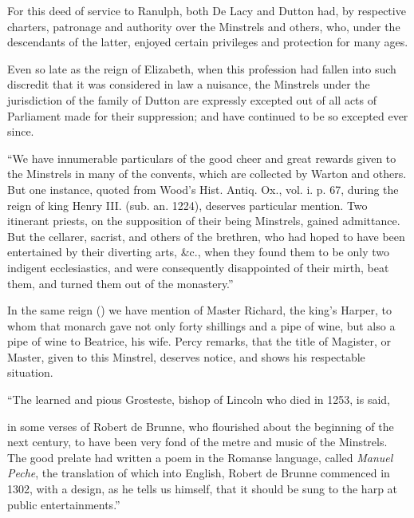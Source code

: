 For this deed of service to Ranulph, both De Lacy and Dutton had, by
respective charters, patronage and authority over the Minstrels and others, who,
under the descendants of the latter, enjoyed certain privileges and protection for
many ages.

Even so late as the reign of Elizabeth, when this profession had fallen into such
discredit that it was considered in law a nuisance, the Minstrels under the jurisdiction
of the family of Dutton are expressly excepted out of all acts of Parliament
made for their suppression; and have continued to be so excepted ever since.

“We have innumerable particulars of the good cheer and great rewards given to
the Minstrels in many of the convents, which are collected by Warton and others.
But one instance, quoted from Wood’s Hist. Antiq. Ox., vol. i. p. 67, during the reign
of king Henry III. (sub. an. 1224), deserves particular mention. Two itinerant
priests, on the supposition of their being Minstrels, gained admittance. But the
cellarer, sacrist, and others of the brethren, who had hoped to have been entertained
by their diverting arts, \&c., when they found them to be only two indigent ecclesiastics,
and were consequently disappointed of their mirth, beat them, and turned
them out of the monastery.”

In the same reign () we have mention of Master Richard, the king’s
Harper, to whom that monarch gave not only forty shillings and a pipe of wine,
but also a pipe of wine to Beatrice, his wife. Percy remarks, that the title of
Magister, or Master, given to this Minstrel, deserves notice, and shows his
respectable situation.

“The learned and pious Grosteste, bishop
\pagebreak
of Lincoln who died in 1253, is said,
in some verses of Robert de Brunne, who flourished about the beginning of the 
next century, to have been very fond of the metre and music of the Minstrels.
The good prelate had written a poem in the Romanse language, called \textit{Manuel
Peche}, the translation of which into English, Robert de Brunne commenced in
1302, with a design, as he tells us himself, that it should be sung to the harp at
public entertainments.”



